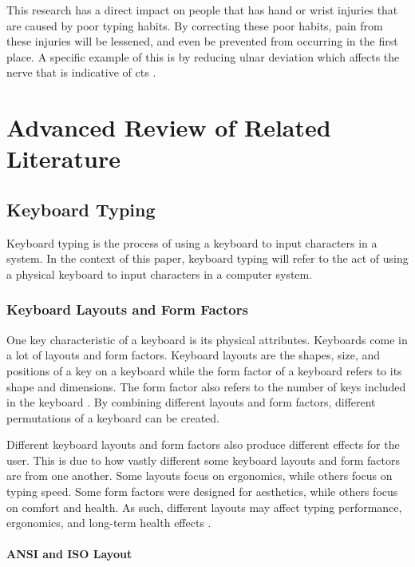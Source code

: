 \documentclass{report}
\begin{document}
This research has a direct impact on people that has hand or wrist injuries that
are caused by poor typing habits. By correcting these poor habits, pain from
these injuries will be lessened, and even be prevented from occurring in the
first place. A specific example of this is by reducing ulnar deviation which
affects the nerve that is indicative of \ac{cts} \parencite{toosi2015}.

\chapter{Advanced Review of Related Literature}

\section{Keyboard Typing}

Keyboard typing is the process of using a keyboard to input characters in a
system. In the context of this paper, keyboard typing will refer to the act of
using a physical keyboard to input characters in a computer system.


\subsection{Keyboard Layouts and Form Factors}

One key characteristic of a keyboard is its physical attributes. Keyboards come
in a lot of layouts and form factors. Keyboard layouts are the shapes, size, and
positions of a key on a keyboard while the form factor of a keyboard refers to
its shape and dimensions. The form factor also refers to the number of keys included
in the keyboard \parencite{parkkinen2018}. By combining different layouts and
form factors, different permutations of a keyboard can be created.

Different keyboard layouts and form factors also produce different effects for
the user. This is due to how vastly different some keyboard layouts and form
factors are from one another. Some layouts focus on ergonomics, while others
focus on typing speed. Some form factors were designed for aesthetics, while
others focus on comfort and health. As such, different layouts may affect typing
performance, ergonomics, and long-term health effects \parencite{ciobanu2015}.

\subsubsection{ANSI and ISO Layout}
\end{document}
